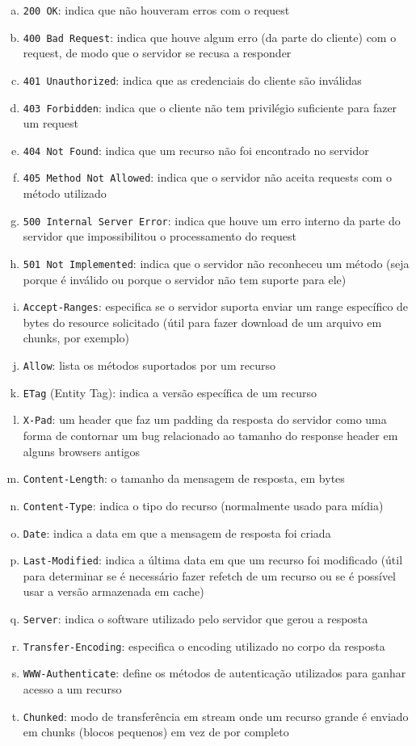 \documentclass{article}
\begin{document}
\begin{enumerate}[(a)]
    \item \texttt{200 OK}: indica que não houveram erros com o request
    \item \texttt{400 Bad Request}: indica que houve algum erro (da parte do cliente) com o request, de modo que o servidor se recusa a responder
    \item \texttt{401 Unauthorized}: indica que as credenciais do cliente são inválidas
    \item \texttt{403 Forbidden}: indica que o cliente não tem privilégio suficiente para fazer um request
    \item \texttt{404 Not Found}: indica que um recurso não foi encontrado no servidor
    \item \texttt{405 Method Not Allowed}: indica que o servidor não aceita requests com o método utilizado
    \item \texttt{500 Internal Server Error}: indica que houve um erro interno da parte do servidor que impossibilitou o processamento do request
    \item \texttt{501 Not Implemented}: indica que o servidor não reconheceu um método (seja porque é inválido ou porque o servidor não tem suporte para ele)
    \item \texttt{Accept-Ranges}: especifica se o servidor suporta enviar um range específico de bytes do resource solicitado (útil para fazer download de um arquivo em chunks, por exemplo)
    \item \texttt{Allow}: lista os métodos suportados por um recurso
    \item \texttt{ETag} (Entity Tag): indica a versão específica de um recurso
    \item \texttt{X-Pad}: um header que faz um padding da resposta do servidor como uma forma de contornar um bug relacionado ao tamanho do response header em alguns browsers antigos
    \item \texttt{Content-Length}: o tamanho da mensagem de resposta, em bytes
    \item \texttt{Content-Type}: indica o tipo do recurso (normalmente usado para mídia)
    \item \texttt{Date}: indica a data em que a mensagem de resposta foi criada
    \item \texttt{Last-Modified}: indica a última data em que um recurso foi modificado (útil para determinar se é necessário fazer refetch de um recurso ou se é possível usar a versão armazenada em cache)
    \item \texttt{Server}: indica o software utilizado pelo servidor que gerou a resposta
    \item \texttt{Transfer-Encoding}: especifica o encoding utilizado no corpo da resposta
    \item \texttt{WWW-Authenticate}: define os métodos de autenticação utilizados para ganhar acesso a um recurso
    \item \texttt{Chunked}: modo de transferência em stream onde um recurso grande é enviado em chunks (blocos pequenos) em vez de por completo
\end{enumerate}
\end{document}
